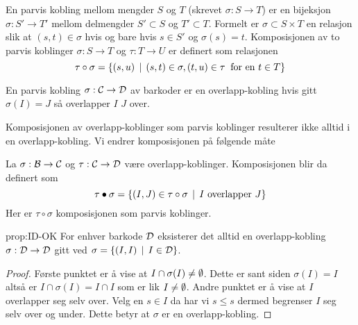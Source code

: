 \begin{definisjon}\label{def:Parvis-Kobling}
  En parvis kobling mellom mengder $S$ og $T$ (skrevet $\sigma:S\to T$) er en bijeksjon $\sigma: S'\to T'$ mellom delmengder $S'\subset S$ og $T'\subset T$. Formelt er $\sigma\subset S\times T$ en relasjon slik at $(s,t)\in \sigma$ hvis og bare hvis $s\in S'$ og $\sigma(s)=t$. Komposisjonen av to parvis koblinger $\sigma: S\to T$ og $\tau: T\to U$ er definert som relasjonen
  \[\tau\circ\sigma=\left\{(s,u)\,\mid\,(s,t)\in \sigma, (t,u)\in \tau\;\;\text{for en $t\in T$}\right\}\]
\end{definisjon}

\begin{definisjon}\label{def:OverlappMch}
  En parvis kobling $\sigma: \mathcal{C}\to \mathcal{D}$ av barkoder er en overlapp-kobling hvis gitt $\sigma(I)=J$ så overlapper $I$ $J$ over.
\end{definisjon}

Komposisjonen av overlapp-koblinger som parvis koblinger resulterer ikke alltid i en overlapp-kobling. Vi endrer komposisjonen på følgende måte 

\begin{definisjon}\label{def:OK-Komp}
    La $\sigma: \mathcal{B}\to \mathcal{C}$ og $\tau:\mathcal{C}\to\mathcal{D}$ være overlapp-koblinger. Komposisjonen blir da definert som
    \[\tau\bullet\sigma = \left\{(I,J)\in\tau\circ\sigma\,\mid\,\text{$I$ overlapper $J$}\right\}\]
    Her er $\tau\circ\sigma$ komposisjonen som parvis koblinger.
\end{definisjon}

\begin{proposisjon}{prop:ID-OK}
For enhver barkode $\mathcal{D}$ eksisterer det alltid en overlapp-kobling $\sigma:\mathcal{D}\to\mathcal{D}$ gitt ved $\sigma = \left\{(I,I)\,\mid\,I\in\mathcal{D}\right\}$.
\end{proposisjon}
\begin{proof}
Første punktet er å vise at $I\cap\sigma(I)\neq\emptyset$. Dette er sant siden $\sigma(I)=I$ altså er $I\cap\sigma(I)=I\cap I$ som er lik $I\neq\emptyset$. Andre punktet er å vise at $I$ overlapper seg selv over. Velg en $s\in I$ da har vi $s\leq s$ dermed begrenser $I$ seg selv over og under. Dette betyr at $\sigma$ er en overlapp-kobling.
\end{proof}

